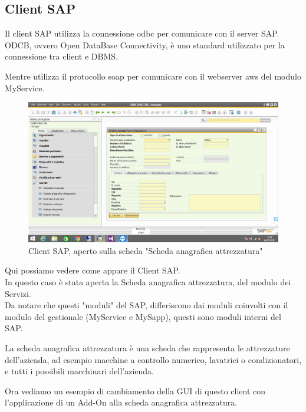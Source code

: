 \subsection{Client SAP}
\begin{flushleft}
	\item Il client SAP utilizza la connessione \gls{odbc} per comunicare con il server SAP.\\ODCB, ovvero Open DataBase Connectivity, è uno standard utilizzato per la connessione tra client e DBMS. 
	\item Mentre utilizza il protocollo \gls{soap} per comunicare con il webserver \gls{aws} del modulo MyService.
\end{flushleft}
\begin{figure}[!h] 
	\centering 
	\includegraphics[scale = 0.4]{immagini/client-sap.png} 
	\caption {Client SAP, aperto sulla scheda "Scheda anagrafica attrezzatura"}
\end{figure}
\begin{flushleft}
	\item Qui possiamo vedere come appare il Client SAP.\\In questo caso è stata aperta la Scheda anagrafica attrezzatura, del modulo dei Servizi.\\Da notare che questi "moduli" del SAP, differiscono dai moduli coinvolti con il modulo del gestionale (MyService e MySapp), questi sono moduli interni del SAP.
	\item La scheda anagrafica attrezzatura è una scheda che rappresenta le attrezzature dell'azienda, ad esempio macchine a controllo numerico, lavatrici o condizionatori, e tutti i possibili macchinari dell'azienda.
	\item Ora vediamo un esempio di cambiamento della GUI di questo client con l'applicazione di un Add-On alla scheda anagrafica attrezzatura.
\end{flushleft}
